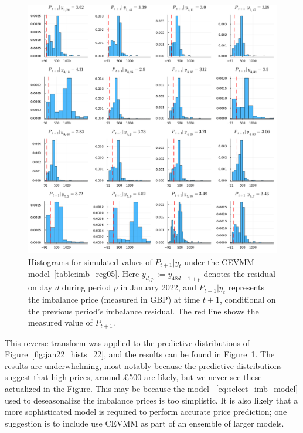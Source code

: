 \documentclass[11pt,twoside,openany]{book}
\numberwithin{Theorem}{chapter}
\numberwithin{Definition}{chapter}
\numberwithin{Lemma}{chapter}
\numberwithin{Algorithm}{chapter}
\numberwithin{equation}{chapter}
\begin{document}
\begin{figure}[htp]
  \centering
  \includegraphics[scale=0.5]{../elexon/figures/price_preds_jan_22.pdf}
  \caption{Histograms for simulated values of $P_{t+1}|y_{t}$ under the CEVMM
    model~\ref{table:imb_reg05}. Here $y_{d,p}:=y_{48d - 1 + p}$ denotes the
    residual on day $d$ during period $p$ in January 2022, and $P_{t+1}|y_t$
    represents the imbalance price (measured in GBP) at time $t+1$, conditional
  on the previous period's imbalance residual. The red line shows the measured
value of $P_{t+1}$.}\label{fig:gbp_trans_hists}
\end{figure}


This reverse transform was applied to the predictive distributions of
Figure~\ref{fig:jan22_hists_22}, and the results can be found in
Figure~\ref{fig:gbp_trans_hists}. The results are underwhelming, most notably because the
predictive distributions suggest that high prices, around £500 are likely, but we
never see these actualized in the Figure. This may be because the model
~\eqref{eq:select_imb_model} used to deseasonalize the imbalance prices is too
simplistic. It is also likely that a more sophisticated model is required to
perform accurate price prediction; one suggestion is to include use CEVMM
as part of an ensemble of larger models.

\FloatBarrier
\end{document}
